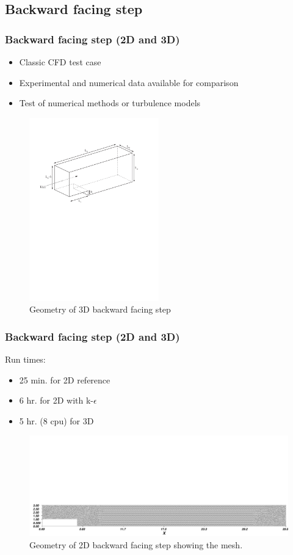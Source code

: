 \subsection{Backward facing step}

\begin{frame}
    \frametitle{Backward facing step (2D and 3D)}
\begin{itemize}
\item Classic CFD test case
\item Experimental and numerical data available for comparison
\item Test of numerical methods or turbulence models
\end{itemize}
\begin{figure}
\centering
\includegraphics[width=0.5\textwidth]{./backward_facing_step/backward_facing_step_3d-schematic}
\caption{Geometry of 3D backward facing step}
\end{figure}
\end{frame}
%
\begin{frame}
    \frametitle{Backward facing step (2D and 3D)}
Run times: 
\begin{itemize}
\item 25 min. for 2D reference
\item 6 hr. for 2D with k-$\epsilon$
\item 5 hr. (8 cpu) for 3D
\end{itemize}
\begin{figure}
\centering
\includegraphics[width=1.0\textwidth]{./backward_facing_step/backward_facing_step_2d-mesh}
\caption{Geometry of 2D backward facing step showing the mesh.}
\end{figure}
\end{frame}
